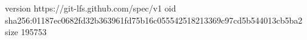 version https://git-lfs.github.com/spec/v1
oid sha256:01187ec0682fd32b363961fd75b16c055542518213369c97cd5b544013cb5ba2
size 195753
